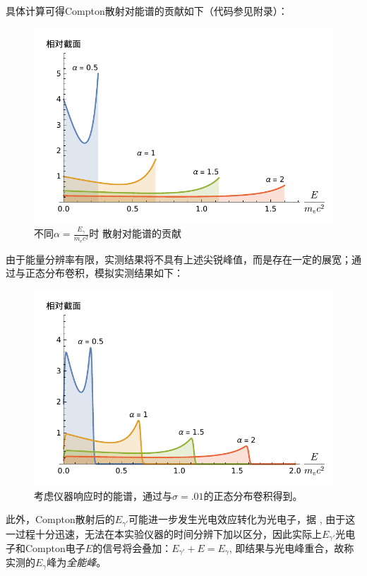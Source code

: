 \documentclass[aps,pre,12pt,preprint,%
	onecolumn,showpacs,showkeys,nofootinbib]{revtex4-1}
\begin{document}
	具体计算可得Compton散射对能谱的贡献如下（代码参见附录）：
	\begin{figure}[!ht]
		\vspace{-.5\baselineskip}
		\includegraphics[width=.75\linewidth]{img/plots/comptonSpectrum.pdf}
		\caption[Compton散射对能谱的贡献]{%
			不同$\alpha = \frac{E_\gamma}{m_e c^2}$时
			散射对能谱的贡献
		}
		\label{fig:ComptonSpectrum}
		\vspace{-.5\baselineskip}
	\end{figure}
\FloatBarrier\noindent
	由于能量分辨率有限，实测结果将不具有上述尖锐峰值，而是存在一定的展宽；通过与正态分布卷积，模拟实测结果如下：
	\begin{figure}[!ht]
		\vspace{-.5\baselineskip}
		\includegraphics[width=.75\linewidth]{img/plots/comptonSpectrumObs.pdf}
		\caption[考虑仪器响应时的Compton能谱]{%
			考虑仪器响应时的能谱，通过与$\sigma = \num{.01}$的正态分布卷积得到。
		}
		\label{fig:ComptonSpectrumObs}
		\vspace{-.5\baselineskip}
	\end{figure}
\clearpage
	
	此外，Compton散射后的$E_{\gamma'}$可能进一步发生光电效应转化为光电子，据 \cite{textbook}, 由于这一过程十分迅速，无法在本实验仪器的时间分辨下加以区分，因此实际上$E_{\gamma'}$光电子和Compton电子$E$的信号将会叠加：$E_{\gamma'} + E = E_\gamma$, 即结果与光电峰重合，故称实测的$E_\gamma$峰为\textit{全能峰}。
	
\end{document}

